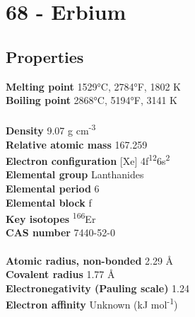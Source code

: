 \section{68 - Erbium}
\label{sec:elem-erbium}
\subsection{Properties}
\textbf{Melting point} 1529°C, 2784°F, 1802 K\\
\textbf{Boiling point} 2868°C, 5194°F, 3141 K\\
\\
\textbf{Density} 9.07 g cm\textsuperscript{-3}\\
\textbf{Relative atomic mass} 167.259\\
\textbf{Electron configuration} [Xe] 4f\textsuperscript{12}6s\textsuperscript{2}\\
\textbf{Elemental group} Lanthanides\\
\textbf{Elemental period} 6\\
\textbf{Elemental block} f\\
\textbf{Key isotopes} \textsuperscript{166}Er\\
\textbf{CAS number} 7440-52-0\\
\\
\textbf{Atomic radius, non-bonded} 2.29 Å\\
\textbf{Covalent radius} 1.77 Å\\
\textbf{Electronegativity (Pauling scale)} 1.24\\
\textbf{Electron affinity} Unknown (kJ mol\textsuperscript{-1})\\